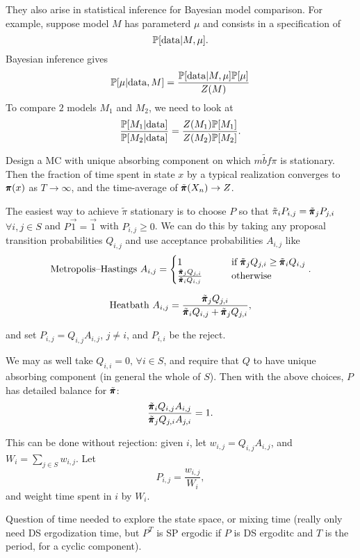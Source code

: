 They also arise in statistical inference for Bayesian model comparison. For example, suppose model $M$ has parameterd $\mu$ and consists in a specification of 
$$
\mathbb{P} [\text{data} | M, \mu].
$$
Bayesian inference gives 
$$
\mathbb{P} [\mu | \text{data}, M] = \frac{\mathbb{P} [\text{data} | M, \mu] \mathbb{P}[\mu]}{Z(M)}
$$
To compare $2$ models $M_1$ and $M_2$, we need to look at 
$$
\frac{\mathbb{P}[M_1 | \text{data}]}{\mathbb{P}[M_2 | \text{data}]} = \frac{Z(M_1) \mathbb{P}[M_1]}{Z(M_2) \mathbb{P}[M_2]}.
$$

Design a MC with unique absorbing component on which $\tilde{mbf{\pi}}$ is stationary. Then the fraction of time spent in state $x$ by a typical realization converges to $\pmb{\pi}(x)$ as $T \to \infty$, and the time-average of $\tilde{\pmb{\pi}}(X_n) \to Z$.

The easiest way to achieve $\tilde{\pi}$ stationary is to choose $P$ so that $\tilde{\pi}_i P_{i,j} = \tilde{\pmb{\pi}}_j P_{j,i}$ $\forall i,j \in S$ and $P \vec{1} = \vec{1}$ with $P_{i,j} \ge 0$. We can do this by taking any proposal transition probabilities $Q_{i,j}$ and use acceptance probabilities $A_{i,j}$ like
$$
\text{Metropolis–Hastings } A_{i,j} = 
\begin{cases}
    1 \qquad & \text{if } \tilde{\pmb{\pi}}_j Q_{j,i} \ge \tilde{\pmb{\pi}}_i Q_{i,j} \\ 
    \frac{\tilde{\pmb{\pi}}_j Q_{j,i}}{\tilde{\pmb{\pi}}_i Q_{i,j}} \qquad &\text{otherwise}
\end{cases}.
$$

$$
\text{Heatbath } A_{i,j} = \frac{\tilde{\pmb{\pi}}_j Q_{j,i}}{\tilde{\pmb{\pi}}_i Q_{i,j} + \tilde{\pmb{\pi}}_j Q_{j,i}},
$$

and set $P_{i,j} = Q_{i,j} A_{i,j}$, $j \neq i$, and $P_{i,i}$ be the reject.

We may as well take $Q_{i,i} = 0,\, \forall i \in S$, and require that $Q$ to have unique absorbing component (in general the whole of $S$). Then with the above choices, $P$ has detailed balance for $\tilde{\pmb{\pi}}$:
$$
\frac{\tilde{\pmb{\pi}}_i Q_{i,j} A_{i,j}}{\tilde{\pmb{\pi}}_j Q_{j,i}A_{j,i}} = 1.
$$

This can be done without rejection: given $i$, let $w_{i,j} = Q_{i,j} A_{i,j}$, and $W_{i} = \sum_{j \in S} w_{i,j}$. Let 
$$
P_{i,j} = \frac{w_{i,j}}{W_i},
$$ 
and weight time spent in $i$ by $W_i$. 

Question of time needed to explore the state space, or mixing time (really only need DS ergodization time, but $P^T$ is SP ergodic if $P$ is DS ergoditc and $T$ is the period, for a cyclic component).

